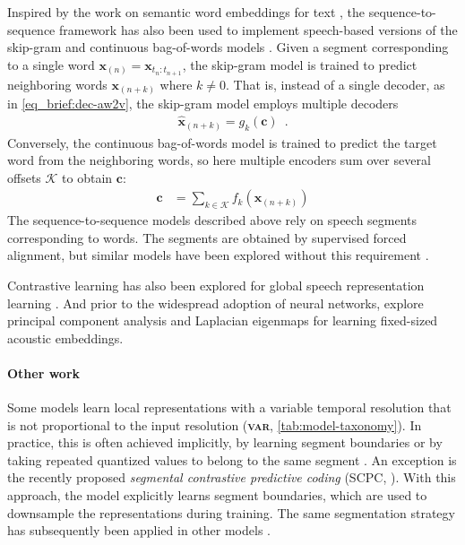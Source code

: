{Inspired by the work on semantic word embeddings for text \parencite{mikolov_distributed_2013}, the sequence-to-sequence framework has also been used to implement speech-based versions of the skip-gram and continuous bag-of-words models \parencite{chung_learning_2017, chung_speech2vec_2018}. Given a segment corresponding to a single word $\mathbf{x}_{(n)} = \mathbf{x}_{t_{n}:t_{n+1}}$, the skip-gram model is trained to predict neighboring words $\mathbf{x}_{(n + k)}$ where $k\ne0$. That is, instead of a single decoder, as in \cref{eq_brief:dec-aw2v}, the skip-gram model employs multiple decoders
%
\begin{align}
    \hat{\mathbf{x}}_{(n + k)} = g_k(\mathbf{c})\enspace.
\end{align}
%
Conversely, the continuous bag-of-words model is trained to predict the target word from the neighboring words, so here multiple encoders sum over several offsets $\mathcal{K}$ to obtain $\mathbf{c}$:
%
\begin{align}
    \mathbf{c} &= \sum_{k\in\mathcal{K}} f_k(\mathbf{x}_{(n + k)}) %
\end{align}
The sequence-to-sequence models described above rely on speech segments corresponding to words. The segments are obtained by supervised forced alignment, but similar models have been explored without this requirement \parencite{jati_speaker2vec_2017, tagliasacchi_pretraining_2020}.

Contrastive learning has also been explored for global speech representation learning \parencite{milde_unspeech_2018, jati_neural_2019, jansen_unsupervised_2018}. And prior to the widespread adoption of neural networks, \textcite{levin_fixeddimensional_2013} explore principal component analysis and Laplacian eigenmaps for learning fixed-sized acoustic embeddings.

\paragraph{Other work}
Some models learn local representations with a variable temporal resolution that is not proportional to the input resolution (\textbf{\textsc{var}}, \cref{tab:model-taxonomy}). In practice, this is often achieved implicitly, by learning segment boundaries or by taking repeated quantized values to belong to the same segment \parencite{kamper_unsupervised_2021, chorowski_unsupervised_2019, michel_blind_2017, kreuk_selfsupervised_2020, wang_gate_2017, dieleman_variablerate_2021}. An exception is the recently proposed \emph{segmental contrastive predictive coding} (SCPC, \citealp{bhati_segmental_2021, bhati_unsupervised_2022}). With this approach, the model explicitly learns segment boundaries, which are used to downsample the representations during training. The same segmentation strategy has subsequently been applied in other models \parencite{cuervo_contrastive_2022}.

}
